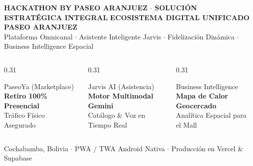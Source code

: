 \documentclass[aspectratio=169, 10pt]{beamer}
\begin{document}
\begin{frame}[plain]

  \begin{center}
    \vspace{0.4cm}
    {\scriptsize \color{AranjuezOrange} \textbf{HACKATHON BY PASEO ARANJUEZ $\cdot$ SOLUCIÓN ESTRATÉGICA INTEGRAL}}
    \vskip 0.25cm
    {\LARGE \textbf{\color{white}ECOSISTEMA DIGITAL UNIFICADO}} \\
    \vskip 0.1cm
    {\Large \textbf{\color{AranjuezGold}PASEO ARANJUEZ}} \\
    \vskip 0.2cm
    {\footnotesize \color{AranjuezMuted} Plataforma Omnicanal $\cdot$ Asistente Inteligente Jarvis $\cdot$ Fidelización Dinámica $\cdot$ Business Intelligence Espacial}
    \vskip 0.6cm

    \begin{columns}[c]
      \begin{column}{0.31\textwidth}
        \begin{alertblock}{PaseoYa (Marketplace)}
          \centering \scriptsize \textbf{Retiro 100\% Presencial} \\ Tráfico Físico Asegurado
        \end{alertblock}
      \end{column}
      \begin{column}{0.31\textwidth}
        \begin{block}{Jarvis AI (Asistencia)}
          \centering \scriptsize \textbf{Motor Multimodal Gemini} \\ Catálogo \& Voz en Tiempo Real
        \end{block}
      \end{column}
      \begin{column}{0.31\textwidth}
        \begin{exampleblock}{Business Intelligence}
          \centering \scriptsize \textbf{Mapa de Calor Geocercado} \\ Analítica Espacial para el Mall
        \end{exampleblock}
      \end{column}
    \end{columns}

    \vskip 0.5cm
    {\tiny \color{AranjuezMuted} Cochabamba, Bolivia $\cdot$ PWA / TWA Android Nativa $\cdot$ Producción en Vercel \& Supabase}
  \end{center}
\end{frame}
\end{document}
